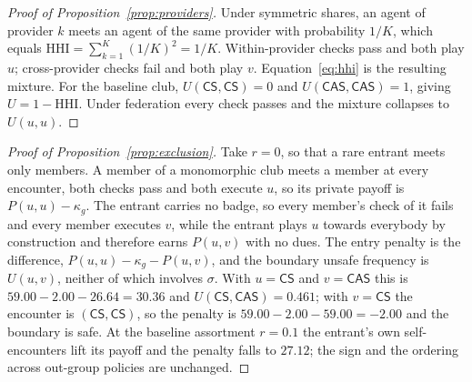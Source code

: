 \documentclass[11pt,a4paper]{article}
\newcommand{\CS}{\textsf{CS}}
\newcommand{\CAS}{\textsf{CAS}}
\begin{document}
\begin{proof}[Proof of Proposition~\ref{prop:providers}]
Under symmetric shares, an agent of provider $k$ meets an agent of the same
provider with probability $1/K$, which equals
$\mathrm{HHI} = \sum_{k=1}^{K} (1/K)^{2} = 1/K$.
Within-provider checks pass and both play $u$; cross-provider checks
fail and both play $v$. Equation~\eqref{eq:hhi} is the resulting mixture. For
the baseline club, $U(\CS, \CS) = 0$ and $U(\CAS, \CAS) = 1$, giving
$U = 1 - \mathrm{HHI}$. Under federation every check passes and the mixture
collapses to $U(u,u)$.
\end{proof}

\begin{proof}[Proof of Proposition~\ref{prop:exclusion}]
Take $r = 0$, so that a rare entrant meets only members. A member of a
monomorphic club meets a member at every encounter, both checks pass and both
execute $u$, so its private payoff is $P(u,u) - \kappa_g$. The entrant carries
no badge, so every member's check of it fails and every member executes $v$,
while the entrant plays $u$ towards everybody by construction and therefore
earns $P(u,v)$ with no dues. The entry penalty is the difference,
$P(u,u) - \kappa_g - P(u,v)$, and the boundary unsafe frequency is $U(u,v)$,
neither of which involves $\sigma$. With $u = \CS$ and $v = \CAS$ this is
$59.00 - 2.00 - 26.64 = 30.36$ and $U(\CS, \CAS) = 0.461$; with $v = \CS$ the
encounter is $(\CS, \CS)$, so the penalty is $59.00 - 2.00 - 59.00 = -2.00$
and the boundary is safe. At the baseline assortment $r = 0.1$ the entrant's
own self-encounters lift its payoff and the penalty falls to $27.12$; the sign
and the ordering across out-group policies are unchanged.
\end{proof}
\end{document}
